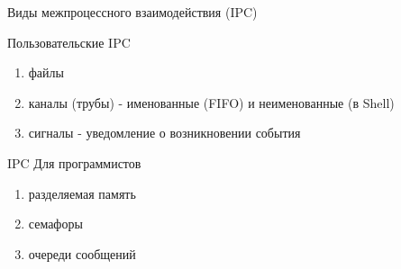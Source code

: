 \begin{frame}{Виды межпроцессного взаимодействия (IPC)}

  \begin{block}{Пользовательские IPC}
    \begin{enumerate}
      \item \alert{файлы}
      \item \alert{каналы (трубы)} - именованные (FIFO) и неименованные (в Shell)\pause
      \item \alert{сигналы} - уведомление о возникновении события
    \end{enumerate}
  \end{block}\pause

  \begin{block}{IPC Для программистов}
    \begin{enumerate}
      \item \alert{разделяемая память}
      \item \alert{семафоры}
      \item \alert{очереди сообщений}
    \end{enumerate}
  \end{block}

\end{frame}
